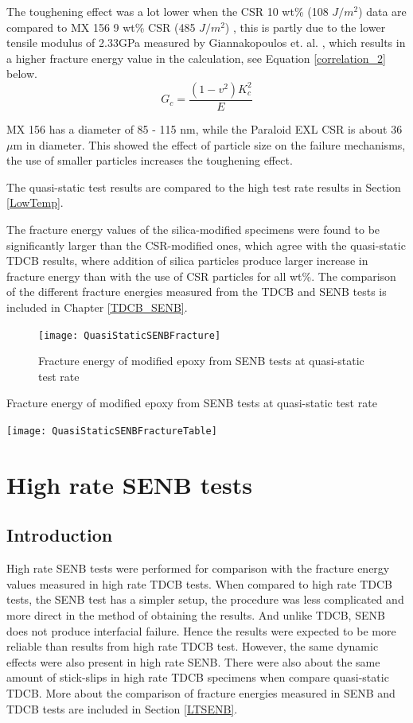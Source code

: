 \documentclass[numbers=noendperiod,chapterprefix=on]{icldt} %
\begin{document}
The toughening effect was a lot lower when the CSR 10 wt\% (108  $J/m^2$) data are compared to MX 156 9 wt\% CSR  (485 $J/m^2$) \cite{Giannakopoulos2011}, this is partly due to the lower tensile modulus of 2.33GPa measured by Giannakopoulos et. al. \cite{Giannakopoulos2011}, which results in a higher fracture energy value in the calculation, see Equation \ref{correlation_2} below.
\begin{equation} \label{correlation_2}
G_c = \frac{(1-v^2) K_c^2}{E} 
\end{equation}

MX 156 has a diameter of 85 - 115 nm, while the Paraloid EXL %
CSR is about 36 $ \mu  $m in diameter. This showed the effect of particle size on the failure mechanisms, the use of smaller particles increases the toughening effect.

The quasi-static test results are compared to the high test rate results in Section \ref{LowTemp}. 

The fracture energy values of the silica-modified specimens were found to be significantly larger than the CSR-modified ones, which agree with the quasi-static TDCB results, where addition of silica particles produce larger increase in fracture energy than with the use of CSR particles for all wt\%. The comparison of the different fracture energies measured from the TDCB and SENB tests is included in Chapter \ref{TDCB_SENB}.
\begin{figure}[!hp]
\centering
\texttt{[image: QuasiStaticSENBFracture]}
\caption{Fracture energy of modified epoxy from SENB tests at quasi-static test rate} \label{QuasiStaticSENBFracture}\end{figure}
\FloatBarrier
\begin{table}[!htpb]
\centering
\caption{Fracture energy of modified epoxy from SENB tests at quasi-static test rate } \label{QuasiStaticSENBFractureTable}
\texttt{[image: QuasiStaticSENBFractureTable]}
\end{table}
\FloatBarrier

\section{High rate SENB tests} \label{HR_SENB}

\subsection{Introduction}
High rate SENB tests were performed for comparison with the fracture energy values measured in high rate TDCB tests. When compared to high rate TDCB tests, the SENB test has a simpler setup, the procedure was less complicated and more direct in the method of obtaining the results.
And unlike TDCB, SENB does not produce interfacial failure.
Hence the results were expected to be more reliable than results from high rate TDCB test.  However, the same dynamic effects were also present in high rate SENB. There were also about the same amount of stick-slips in high rate TDCB specimens when compare quasi-static TDCB. More about the comparison of fracture energies measured in SENB and TDCB tests are included in Section \ref{LTSENB}.
\end{document}
